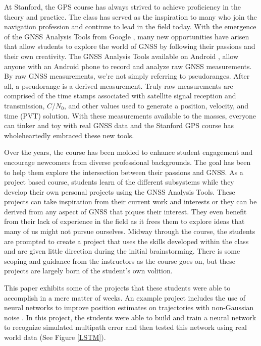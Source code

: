 \documentclass[12pt, conference, onecolumn, draftclsnofoot]{IEEEtran}
\begin{document}
At Stanford, the GPS course has always strived to achieve proficiency in the theory and practice.
The class has served as the inspiration to many who join the navigation profession and continue to lead in the field today.
With the emergence of the GNSS Analysis Tools from Google \cite{vanDiggelen2018}, many new opportunities have arisen that allow students to explore the world of GNSS by following their passions and their own creativity.
The GNSS Analysis Tools available on Android \cite{GNSSAnalysisTools}, allow anyone with an Android phone to record and analyze raw GNSS measurements.
By raw GNSS measurements, we're not simply referring to pseudoranges.
After all, a pseudorange is a derived measurement.
Truly raw measurements are comprised of the time stamps associated with satellite signal reception and transmission, $C$/$N_0$, and other values used to generate a position, velocity, and time (PVT) solution.
With these measurements available to the masses, everyone can tinker and toy with real GNSS data and the Stanford GPS course has wholeheartedly embraced these new tools.

Over the years, the course has been molded to enhance student engagement and encourage newcomers from diverse professional backgrounds. 
The goal has been to help them explore the intersection between their passions and GNSS.
As a project based course, students learn of the different subsystems while they develop their own personal projects using the GNSS Analysis Tools.
These projects can take inspiration from their current work and interests or they can be derived from any aspect of GNSS that piques their interest.
They even benefit from their lack of experience in the field as it frees them to explore ideas that many of us might not pursue ourselves.
Midway through the course, the students are prompted to create a project that uses the skills developed within the class and are given little direction during the initial brainstorming.
There is some scoping and guidance from the instructors as the course goes on, but these projects are largely born of the student's own volition.

This paper exhibits some of the projects that these students were able to accomplish in a mere matter of weeks.
An example project includes the use of neural networks to improve position estimates on trajectories with non-Gaussian noise \cite{LSTM2018}.
In this project, the students were able to build and train a neural network to recognize simulated multipath error and then tested this network using real world data (See Figure \ref{LSTM}).
\end{document}
